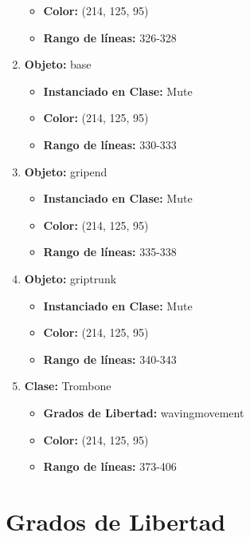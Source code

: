\documentclass[10pt, a4paper]{article}
\begin{document}
\begin{enumerate}
\begin{itemize}
		\item \textbf{Color:} (214, 125, 95)
		\item \textbf{Rango de líneas:} 326-328
	\end{itemize}
	\item \textbf{Objeto:} base
	\begin{itemize}
		\item \textbf{Instanciado en Clase:} Mute
		\item \textbf{Color:} (214, 125, 95)
		\item \textbf{Rango de líneas:} 330-333
	\end{itemize}
	\item \textbf{Objeto:} gripend
	\begin{itemize}
		\item \textbf{Instanciado en Clase:} Mute
		\item \textbf{Color:} (214, 125, 95)
		\item \textbf{Rango de líneas:} 335-338
	\end{itemize}
	\item \textbf{Objeto:} griptrunk 
	\begin{itemize}
		\item \textbf{Instanciado en Clase:} Mute
		\item \textbf{Color:} (214, 125, 95)
		\item \textbf{Rango de líneas:} 340-343
	\end{itemize}
	\item \textbf{Clase:} Trombone
	\begin{itemize}
		\item \textbf{Grados de Libertad:} wavingmovement
		\item \textbf{Color:} (214, 125, 95)
		\item \textbf{Rango de líneas:} 373-406
	\end{itemize}
\end{enumerate}

\newpage

\section{Grados de Libertad}
\end{document}
